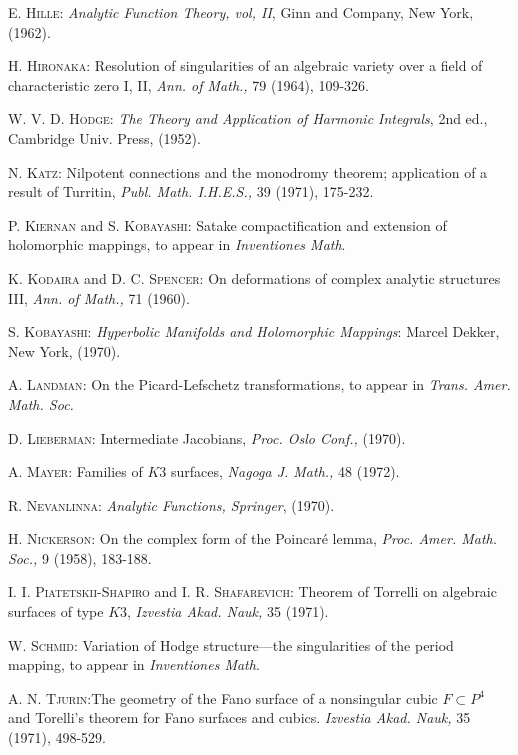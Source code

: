 \begin{thebibliography}{99}
 \textsc{E. Hille}: \textit{Analytic Function Theory, vol, II}, Ginn and Company, New York, (1962). 

 \textsc{H. Hironaka}: Resolution of singularities of an algebraic variety over a field of characteristic zero I, II, \textit{Ann. of Math.,} 79 (1964), 109-326.

 \textsc{W. V. D. Hodge}: \textit{The Theory and Application of Harmonic Integrals}, 2nd ed., Cambridge Univ. Press, (1952).

 \textsc{N. Katz}: Nilpotent connections and the monodromy theorem; application of a result of Turritin, \textit{Publ. Math. I.H.E.S.,} 39 (1971), 175-232.

 \textsc{P. Kiernan} and \textsc{S. Kobayashi}: Satake compactification and extension of holomorphic mappings, to appear in \textit{Inventiones Math}.

 \textsc{K. Kodaira} and \textsc{D. C. Spencer}: On deformations of complex analytic structures III, \textit{Ann. of Math.,} 71 (1960).

 \textsc{S. Kobayashi}: \textit{Hyperbolic Manifolds and Holomorphic Mappings}: Marcel Dekker, New York, (1970).

 \textsc{A. Landman}: On the Picard-Lefschetz transformations, to appear in \textit{Trans. Amer. Math. Soc.}

 \textsc{D. Lieberman}: Intermediate Jacobians, \textit{Proc. Oslo Conf.,} (1970).

 \textsc{A. Mayer}: Families of $K3$ surfaces, \textit{Nagoga J. Math.,} 48 (1972).

 \textsc{R. Nevanlinna}: \textit{Analytic Functions, Springer}, (1970).

 \textsc{H. Nickerson}: On the complex form of the Poincar\'e lemma, \textit{Proc. Amer. Math. Soc.,} 9 (1958), 183-188.

 \textsc{I. I. Piatetskii-Shapiro} and \textsc{I. R. Shafarevich}: Theorem of Torrelli on algebraic surfaces of type $K3$, \textit{Izvestia Akad. Nauk,} 35 (1971).

 \textsc{W. Schmid}: Variation of Hodge structure---the singularities of the period mapping, to appear in \textit{Inventiones Math}.

 \textsc{A. N. Tjurin}:\pageoriginale The geometry of the Fano surface of a nonsingular cubic $F \subset P^4$ and Torelli's theorem for Fano surfaces and cubics. \textit{Izvestia Akad. Nauk,} 35 (1971), 498-529.


\end{thebibliography}
